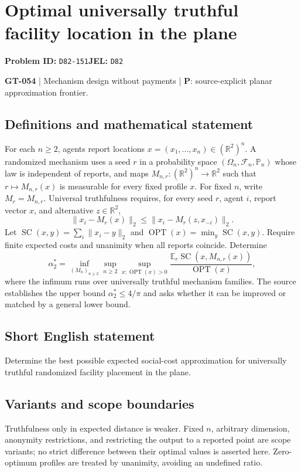 \documentclass[11pt,a4paper]{article}
\begin{document}
\section*{Optimal universally truthful facility location in the plane}
\textbf{Problem ID:} \texttt{D82-151}\quad \textbf{JEL:} \texttt{D82}\par
\label{problem:OP-0184}
\label{game:GT-054}
{\sffamily\small\color{muted}
\textbf{GT-054} | Mechanism design without payments | \textbf{P}: source-explicit planar approximation frontier.
\par}
\subsection*{Definitions and mathematical statement}
For each $n\geq2$, agents report locations $x=(x_1,\ldots,x_n)\in(\mathbb R^2)^n$. A randomized mechanism uses a seed $r$ in a probability space $(\Omega_n,\mathcal F_n,\mathbb P_n)$ whose law is independent of reports, and maps $M_{n,r}:(\mathbb R^2)^n\to\mathbb R^2$ such that $r\mapsto M_{n,r}(x)$ is measurable for every fixed profile $x$. For fixed $n$, write $M_r=M_{n,r}$. Universal truthfulness requires, for every seed $r$, agent $i$, report vector $x$, and alternative $z\in\mathbb R^2$,
\[
 \|x_i-M_r(x)\|_2\leq\|x_i-M_r(z,x_{-i})\|_2.
\]
Let $\operatorname{SC}(x,y)=\sum_i\|x_i-y\|_2$ and $\operatorname{OPT}(x)=\min_y\operatorname{SC}(x,y)$. Require finite expected costs and unanimity when all reports coincide. Determine
\[
 \alpha^*_2=\inf_{(M_n)_{n\geq2}}\sup_{n\geq2}
 \sup_{x:\operatorname{OPT}(x)>0}
 \frac{\mathbb E_r\operatorname{SC}(x,M_{n,r}(x))}{\operatorname{OPT}(x)},
\]
where the infimum runs over universally truthful mechanism families. The source establishes the upper bound $\alpha^*_2\leq4/\pi$ and asks whether it can be improved or matched by a general lower bound.
\subsection*{Short English statement}
Determine the best possible expected social-cost approximation for universally truthful randomized facility placement in the plane.
\subsection*{Variants and scope boundaries}
Truthfulness only in expected distance is weaker. Fixed $n$, arbitrary dimension, anonymity restrictions, and restricting the output to a reported point are scope variants; no strict difference between their optimal values is asserted here. Zero-optimum profiles are treated by unanimity, avoiding an undefined ratio.
\end{document}
